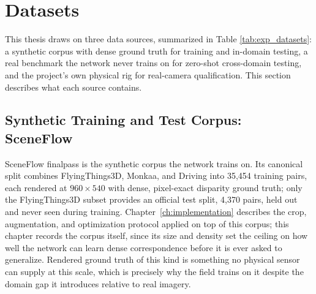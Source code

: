 \FloatBarrier
\vspace{-0.6cm}
\section{Datasets}
\label{sec:exp_datasets}
This thesis draws on three data sources, summarized in Table
\ref{tab:exp_datasets}: a synthetic corpus with dense ground truth for
training and in-domain testing, a real benchmark the network never
trains on for zero-shot cross-domain testing, and the project's own
physical rig for real-camera qualification. This section describes what
each source contains.

\begin{table}[!htbp]
\centering
\caption{Data sources with pair counts, resolution, and ground truth.}
\label{tab:exp_datasets}
\small
{}
\end{table}

\subsection{Synthetic Training and Test Corpus: SceneFlow}
SceneFlow finalpass \cite{mayer2016sceneflow} is the synthetic corpus the
network trains on. Its canonical split combines FlyingThings3D,
Monkaa, and Driving into 35,454 training pairs, each rendered at
$960\times 540$ with dense, pixel-exact disparity ground truth; only the
FlyingThings3D subset provides an official test split, 4,370 pairs, held
out and never seen during training. Chapter~\ref{ch:implementation}
describes the crop, augmentation, and optimization protocol applied on
top of this corpus; this chapter records the corpus itself, since its
size and density set the ceiling on how well the network can learn
dense correspondence before it is ever asked to generalize. Rendered
ground truth of this kind is something no physical sensor can supply at
this scale, which is precisely why the field trains on it despite the
domain gap it introduces relative to real imagery.

